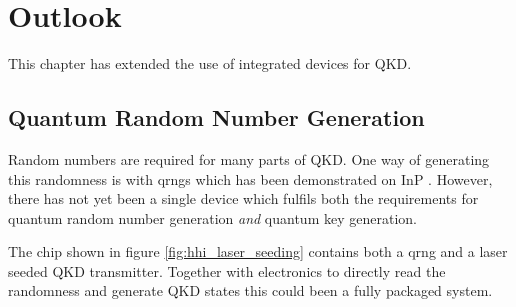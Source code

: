 \section{Outlook}

This chapter has extended the use of integrated devices for \acl{QKD}.

\subsection{Quantum Random Number Generation}

Random numbers are required for many parts of \ac{QKD}. One way of generating this randomness is with \acp{qrng} which has been demonstrated on \ac{InP} \cite{FrancescoThesis,Abellan2016}. However, there has not yet been a single device which fulfils both the requirements for quantum random number generation \textit{and} quantum key generation.

The chip shown in figure \ref{fig:hhi_laser_seeding} contains both a \ac{qrng} and a laser seeded \ac{QKD} transmitter. Together with electronics to directly read the randomness and generate \ac{QKD} states this could been a fully packaged system.

